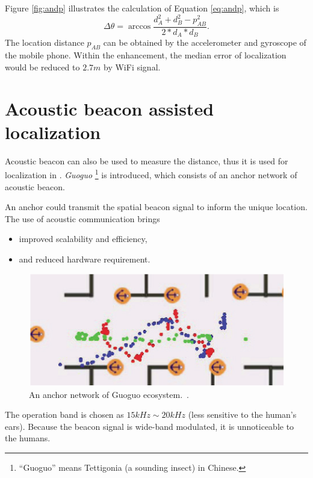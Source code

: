 \documentclass[letterpaper]{article}
\begin{document}
Figure \ref{fig:andp} illustrates the calculation of Equation \ref{eq:andp}, which is
\begin{equation}
\label{eq:andp}
\Delta \theta = \arccos \frac{ d_{A}^{2}+d_{B}^{2}-p_{AB}^{2} }{ 2 * d_{A} * d_{B} }.
\end{equation}
The location distance $ p_{AB} $ can be obtained by the accelerometer and gyroscope of the mobile phone.
Within the enhancement, the median error of localization would be reduced to $ 2.7m $ by WiFi signal.

\section{Acoustic beacon assisted localization}

Acoustic beacon can also be used to measure the distance, thus it is used for localization in \cite{Liu:2013:GEF:2462456.2464450}.
\emph{Guoguo} 
\footnote{``Guoguo'' means Tettigonia (a sounding insect) in Chinese.}
is introduced, which consists of an anchor network of acoustic beacon.

An anchor could transmit the spatial beacon signal to inform the unique location.
The use of acoustic communication brings
\begin{itemize}
	\item improved scalability and efficiency,
	\item and reduced hardware requirement.
\end{itemize}
\begin{figure}
	\centering
	\includegraphics[width=0.9\linewidth]{fig/GUOGUO.png}
	\caption{An anchor network of Guoguo ecosystem.~\cite{Liu:2013:GEF:2462456.2464450}.}
	\label{fig:guoguo}
\end{figure}
The operation band is chosen as $ 15 kHz \sim 20 kHz $ (less sensitive to the human's ears).
Because the beacon signal is wide-band modulated, it is unnoticeable to the humans.
\end{document}
